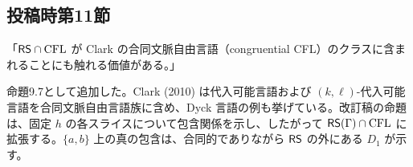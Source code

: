 \subsection*{投稿時第11節}
「$\mathsf{RS}\cap\mathrm{CFL}$ が Clark の合同文脈自由言語（congruential CFL）のクラスに含まれることにも触れる価値がある。」

\Reply
命題9.7として追加した。Clark (2010) は代入可能言語および $(k,\ell)$-代入可能言語を合同文脈自由言語族に含め、Dyck 言語の例も挙げている。改訂稿の命題は、固定 $h$ の各スライスについて包含関係を示し、したがって $\mathsf{RS}(\Gamma)\cap\mathrm{CFL}$ に拡張する。$\{a,b\}$ 上の真の包含は、合同的でありながら $\mathsf{RS}$ の外にある $D_1$ が示す。

